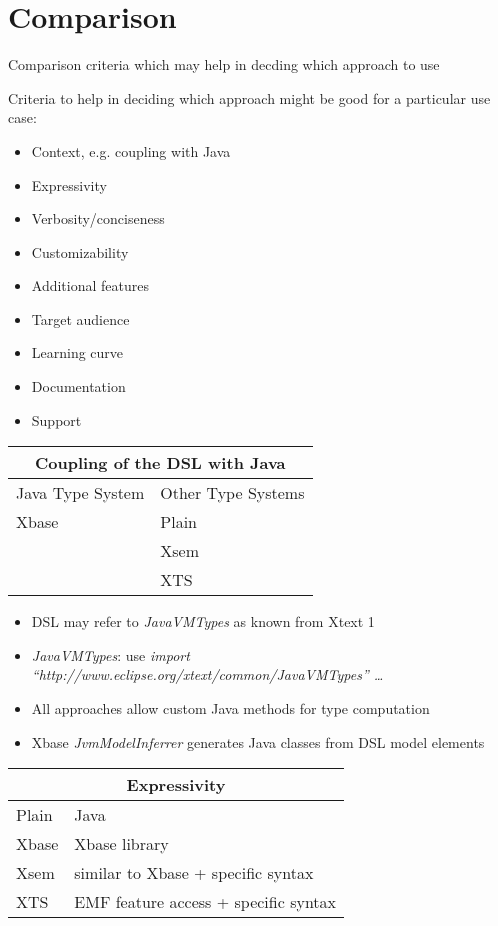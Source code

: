 \section{Comparison}
Comparison criteria which may help in decding which approach to use

Criteria to help in deciding which approach might be good for a particular use
  case:

  \begin{itemize}
    \item Context, e.g. coupling with Java
    \item Expressivity
    \item Verbosity/conciseness
    \item Customizability
    \item Additional features
    \item Target audience
    \item Learning curve
    \item Documentation
    \item Support
  \end{itemize}

\begin{tabularx}{\linewidth}{ X   X }
\multicolumn{2}{c}{Coupling of the DSL with Java} \\ \hline
Java Type System & Other Type Systems \\ \hline
Xbase & Plain  \\
& Xsem  \\
& XTS  \\
\end{tabularx}

\begin{itemize}
  \item DSL may refer to \emph{JavaVMTypes} as known from Xtext 1
   \item \emph{JavaVMTypes}: use \emph{import
   ``http://\-www.eclipse.org/\-xtext/\-common/\-JavaVMTypes'' \ldots}
  \item All approaches allow custom Java methods for type computation
 \item Xbase \emph{JvmModelInferrer} generates Java classes from DSL model
 elements
\end{itemize}

\begin{tabularx}{\linewidth}{ l   X }
\multicolumn{2}{c}{Expressivity} \\ \hline
Plain & Java \\
Xbase & Xbase library \\
Xsem & similar to Xbase + specific syntax\\
XTS & EMF feature access + specific syntax\\
\end{tabularx}


